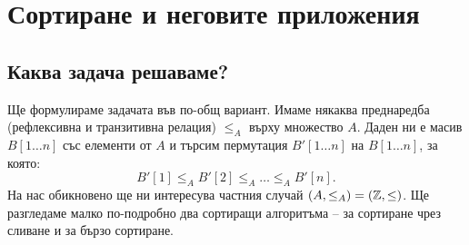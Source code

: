 \chapter{Сортиране и неговите приложения}

\section{Каква задача решаваме?}

Ще формулираме задачата във по-общ вариант.
Имаме някаква преднаредба (рефлексивна и транзитивна релация) $\leq_A$ върху множество $A$.
Даден ни е масив $B[1 \dots n]$ със елементи от $A$ и търсим пермутация $B'[1 \dots n]$ на $B[1 \dots n]$, за която:
\[
    B'[1] \leq_A B'[2] \leq_A \dots \leq_A B'[n].
\]
На нас обикновено ще ни интересува частния случай $(A, \leq_A) = (\mathbb{Z}, \leq)$.
Ще разгледаме малко по-подробно два сортиращи алгоритъма -- за сортиране чрез сливане и за бързо сортиране.

